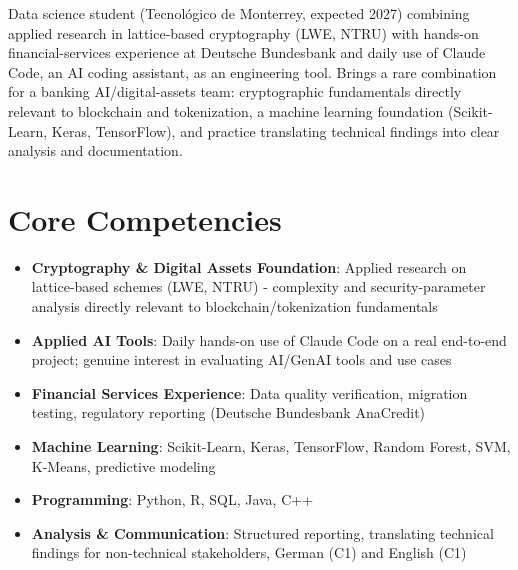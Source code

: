 \documentclass[11pt,a4paper,sans]{moderncv}
\begin{document}
\makecvtitle


\vspace{6pt}
\small{Data science student (Tecnológico de Monterrey, expected 2027) combining applied research in lattice-based cryptography (LWE, NTRU) with hands-on financial-services experience at Deutsche Bundesbank and daily use of Claude Code, an AI coding assistant, as an engineering tool. Brings a rare combination for a banking AI/digital-assets team: cryptographic fundamentals directly relevant to blockchain and tokenization, a machine learning foundation (Scikit-Learn, Keras, TensorFlow), and practice translating technical findings into clear analysis and documentation.}


\section{Core Competencies}
\vspace{1pt}
\begin{itemize}

\item \textbf{Cryptography \& Digital Assets Foundation}: Applied research on lattice-based schemes (LWE, NTRU) - complexity and security-parameter analysis directly relevant to blockchain/tokenization fundamentals

\item \textbf{Applied AI Tools}: Daily hands-on use of Claude Code on a real end-to-end project; genuine interest in evaluating AI/GenAI tools and use cases

\item \textbf{Financial Services Experience}: Data quality verification, migration testing, regulatory reporting (Deutsche Bundesbank AnaCredit)

\item \textbf{Machine Learning}: Scikit-Learn, Keras, TensorFlow, Random Forest, SVM, K-Means, predictive modeling

\item \textbf{Programming}: Python, R, SQL, Java, C++

\item \textbf{Analysis \& Communication}: Structured reporting, translating technical findings for non-technical stakeholders, German (C1) and English (C1)

\end{itemize}
\end{document}
